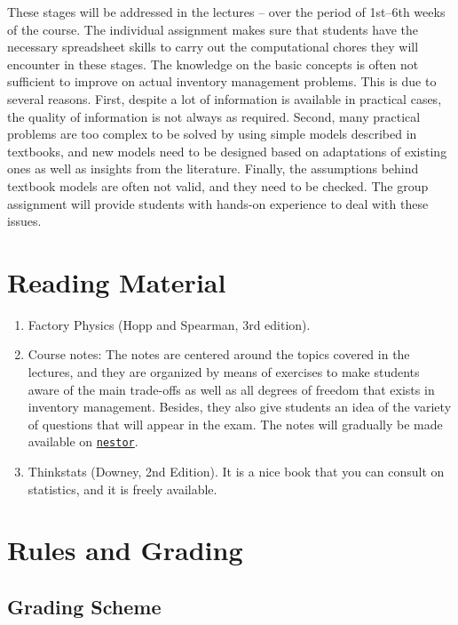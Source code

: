 \documentclass{article}
\begin{document}
These stages will be addressed in the lectures -- over the period of 1st--6th weeks of the course. The individual assignment makes sure that students have the necessary spreadsheet skills to carry out the computational chores they will encounter in these stages. The knowledge on the basic concepts is often not sufficient to improve on actual inventory management problems. This is due to several reasons. First, despite a lot of information is available in practical cases, the quality of information is not always as required. Second, many practical problems are too complex to be solved by using simple models described in textbooks, and new models need to be designed based on adaptations of existing ones as well as insights from the literature. Finally, the assumptions behind textbook models are often not valid, and they need to be checked. The group assignment will provide students with hands-on experience to deal with these issues. 


\section{Reading Material}

\begin{enumerate}
\item Factory Physics (Hopp and Spearman, 3rd edition).
\item Course notes: The notes are centered around the topics covered in the lectures, and they are organized by means of exercises to make students aware of the main trade-offs as well as all degrees of freedom that exists in inventory management. Besides, they also give students an idea of the variety of questions that will appear in the exam. The notes will gradually be made available on \href{nestor.rug.nl}{\texttt{nestor}}.
\item Thinkstats (Downey, 2nd Edition). It is a nice book that you can consult on statistics, and it is freely available.
\end{enumerate}


\section{Rules and Grading}

\subsection{Grading Scheme}
\end{document}
